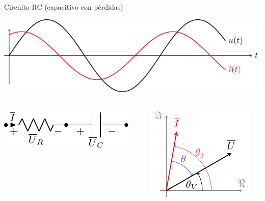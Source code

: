 \documentclass[xcolor={usenames,svgnames,dvipsnames}]{beamer}
\begin{document}
\begin{frame}[label={sec:org91b25de}]{Circuito RC (capacitivo con pérdidas)}
\begin{center}
\includegraphics[height=0.25\textheight]{figs/capacitivo.pdf}
\end{center}


\begin{columns}
\begin{column}{0.45\columnwidth}
\begin{center}
\includegraphics[width=.9\linewidth]{figs/RC.pdf}
\end{center}
\end{column}

\begin{column}{0.55\columnwidth}
\begin{center}
\includegraphics[height=0.45\textheight]{figs/fasorCondensadorReal_VI.pdf}
\end{center}
\end{column}
\end{columns}
\end{frame}
\end{document}
